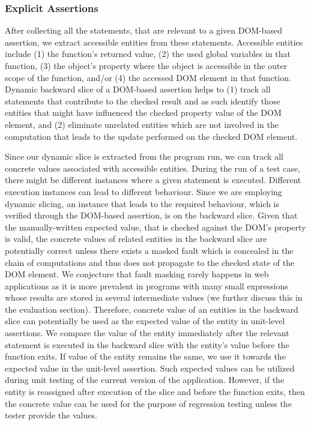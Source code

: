 \subsubsection{Explicit Assertions} \label{Sec:explicitAssertions}
After collecting all the statements, that are relevant to a given DOM-based assertion, we extract accessible entities from these statements.
Accessible entities include (1) the function's returned value, (2) the used global variables in that function, (3) the object's property where the object is accessible in the outer scope of the function, and/or (4) the accessed DOM element in that function. Dynamic backward slice of a DOM-based assertion helps to (1) track all statements that contribute to the checked result and as such identify those entities that might have influenced the checked property value of the DOM element, and (2) eliminate unrelated entities which are not involved in the computation that leads to the update performed on the checked DOM element.

Since our dynamic slice is extracted from the program run, we can track all concrete values associated with accessible entities.
During the run of a test case, there might be different instances where a given statement is executed. Different execution instances can lead to different behaviour. Since we are employing dynamic slicing, an instance that leads to the required behaviour, which is verified through the DOM-based assertion, is on the backward slice. Given that the manually-written expected value, that is checked against the DOM's property is valid, the concrete values of related entities in the backward slice are potentially correct unless there exists a masked fault which is concealed in the chain of computations and thus does not propagate to the checked state of the DOM element. We conjecture that fault masking rarely happens in \javascript web applications as it is more prevalent in programs with many small expressions whose results are stored in several intermediate values (we further discuss this in the evaluation section). Therefore, concrete value of an entities in the backward slice can potentially be used as the expected value of the entity in unit-level assertions.
We compare the value of the entity immediately after the relevant statement is executed in the backward slice with the entity's value before the function exits. If value of the entity remains the same, we use it towards the expected value in the unit-level assertion. Such expected values can be utilized during unit testing of the current version of the application. However, if the entity is reassigned after execution of the slice and before the function exits, then the concrete value can be used for the purpose of regression testing unless the tester provide the values.